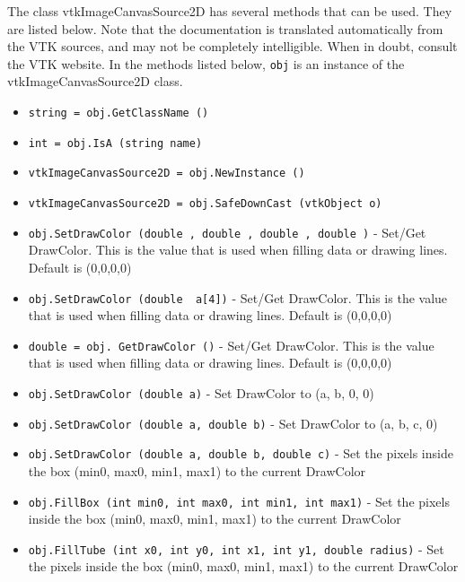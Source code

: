 The class vtkImageCanvasSource2D has several methods that can be used.
  They are listed below.
Note that the documentation is translated automatically from the VTK sources,
and may not be completely intelligible.  When in doubt, consult the VTK website.
In the methods listed below, \verb|obj| is an instance of the vtkImageCanvasSource2D class.
\begin{itemize}
\item  \verb|string = obj.GetClassName ()|

\item  \verb|int = obj.IsA (string name)|

\item  \verb|vtkImageCanvasSource2D = obj.NewInstance ()|

\item  \verb|vtkImageCanvasSource2D = obj.SafeDownCast (vtkObject o)|

\item  \verb|obj.SetDrawColor (double , double , double , double )| -  Set/Get DrawColor.  This is the value that is used when filling data
 or drawing lines. Default is (0,0,0,0)

\item  \verb|obj.SetDrawColor (double  a[4])| -  Set/Get DrawColor.  This is the value that is used when filling data
 or drawing lines. Default is (0,0,0,0)

\item  \verb|double = obj. GetDrawColor ()| -  Set/Get DrawColor.  This is the value that is used when filling data
 or drawing lines. Default is (0,0,0,0)

\item  \verb|obj.SetDrawColor (double a)| -  Set DrawColor to (a, b, 0, 0)

\item  \verb|obj.SetDrawColor (double a, double b)| -  Set DrawColor to (a, b, c, 0)

\item  \verb|obj.SetDrawColor (double a, double b, double c)| -  Set the pixels inside the box (min0, max0, min1, max1) to the current
 DrawColor

\item  \verb|obj.FillBox (int min0, int max0, int min1, int max1)| -  Set the pixels inside the box (min0, max0, min1, max1) to the current
 DrawColor

\item  \verb|obj.FillTube (int x0, int y0, int x1, int y1, double radius)| -  Set the pixels inside the box (min0, max0, min1, max1) to the current
 DrawColor


\end{itemize}
